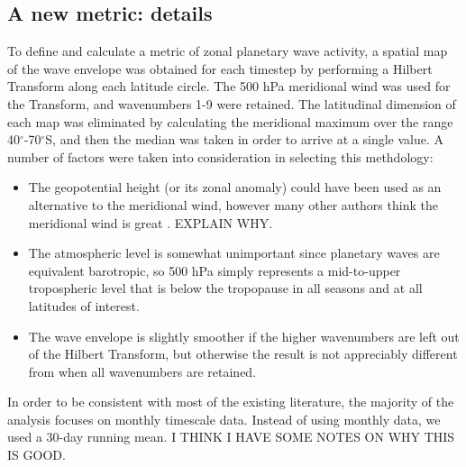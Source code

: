 \subsection{A new metric: details}

To define and calculate a metric of zonal planetary wave activity, a spatial map of the wave envelope was obtained for each timestep by performing a Hilbert Transform along each latitude circle. The 500 hPa meridional wind was used for the Transform, and wavenumbers 1-9 were retained. The latitudinal dimension of each map was eliminated by calculating the meridional maximum over the range 40$^{\circ}$-70$^{\circ}$S, and then the median was taken in order to arrive at a single value. A number of factors were taken into consideration in selecting this methdology:
\begin{itemize}
\item The geopotential height (or its zonal anomaly) could have been used as an alternative to the meridional wind, however many other authors think the meridional wind is great \citep[e.g.]{Hope2014}. EXPLAIN WHY.
\item The atmospheric level is somewhat unimportant since planetary waves are equivalent barotropic, so 500 hPa simply represents a mid-to-upper tropospheric level that is below the tropopause in all seasons and at all latitudes of interest.
\item The wave envelope is slightly smoother if the higher wavenumbers are left out of the Hilbert Transform, but otherwise the result is not appreciably different from when all wavenumbers are retained.  
\end{itemize}

In order to be consistent with most of the existing literature, the majority of the analysis focuses on monthly timescale data. Instead of using monthly data, we used a 30-day running mean. I THINK I HAVE SOME NOTES ON WHY THIS IS GOOD.


